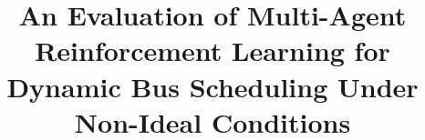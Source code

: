 \documentclass[a4paper, twoside]{report}
\title{An Evaluation of Multi-Agent Reinforcement Learning for Dynamic Bus Scheduling Under Non-Ideal Conditions}
\begin{document}
\onehalfspacing

\end{document}
